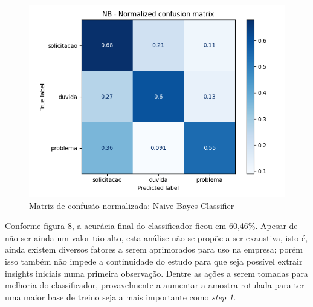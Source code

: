 \documentclass[twocolumn]{rbef}
\newcommand{\1}{\mathbbm{1}}
\begin{document}
\begin{figure}[!htb]
  \centering \includegraphics[scale=0.5]{8. Matriz_confusao_NB_normalizada.png}
  \caption{Matriz de confusão normalizada: Naive Bayes Classifier}
  \label{fig8}
\end{figure}
\newline\linebreak Conforme figura 8, a acurácia final do classificador ficou em 60,46\%. Apesar de não ser ainda um valor tão alto, esta análise não se propõe a ser exaustiva, isto é, ainda existem diversos fatores a serem aprimorados para uso na empresa; porém isso também não impede a continuidade do estudo para que seja possível extrair insights iniciais numa primeira observação. Dentre as ações a serem tomadas para melhoria do classificador, provavelmente a aumentar a amostra rotulada para ter uma maior base de treino seja a mais importante como \emph{step 1}.
\end{document}
